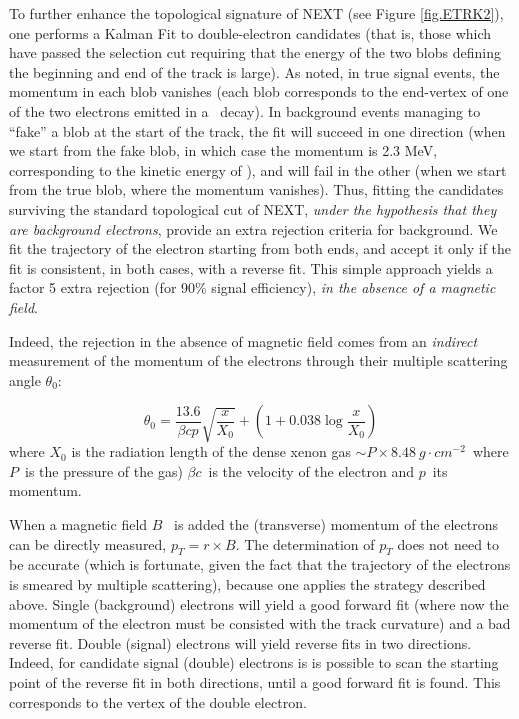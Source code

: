 To further enhance the topological signature of NEXT (see Figure \ref{fig.ETRK2}), one performs a Kalman Fit to double-electron candidates (that is, those which have passed the selection cut requiring that the energy of the two blobs defining the beginning and end of the track is large). As noted, in true signal events, the momentum in each blob vanishes (each blob corresponds to the end-vertex of one of the two electrons emitted in a \bb\ decay). In background events managing to ``fake'' a blob at the start of the track, the fit will succeed in one direction (when we start from the fake blob, in which case the momentum is 2.3 MeV, corresponding to the kinetic energy of \Qbb), and will fail in the other (when we start from the true blob, where the momentum vanishes). Thus, fitting the candidates surviving the standard topological cut of NEXT, {\em under the hypothesis that they are background electrons}, provide an extra rejection criteria for background. We fit the trajectory of the electron starting from both ends, and accept it only if the fit is consistent, in both cases, with a reverse fit.  This simple approach yields a factor 5 extra rejection (for 90\% signal efficiency), {\em in the absence of a magnetic field}.

Indeed, the rejection in the absence of magnetic field comes from an {\em indirect} measurement of the momentum of the electrons through their multiple scattering
angle $\theta_0$:

\begin{equation}
\theta_{0} = \frac{13.6}{\beta c p}\sqrt{\frac{x}{X_0}}+(1 + 0.038 \log{\frac{x}{X_0}})
\end{equation}
% 
 where $X_0$ is the radiation length of the dense xenon gas 
 $\sim P \times 8.48 ~g\cdot cm^{-2}$~where $P$~is the pressure of the gas) 
 $\beta c$~is the velocity of the electron and $p$~its momentum. 
 
 When a magnetic field $B$~ is added the (transverse) momentum of the electrons can be 
 directly measured,  $p_T = r \times B$. The determination of $p_T$ does not need to be accurate (which is fortunate, given the fact that the trajectory of the electrons is smeared by multiple scattering), because one applies the strategy described above. Single (background) electrons will yield a good forward fit (where now the momentum of the electron must be consisted with the track curvature) and a bad reverse fit. Double (signal) electrons will yield reverse fits in two directions. Indeed, for candidate signal (double) electrons is is possible to scan the starting point of the reverse fit in both directions, until a good forward fit is found. This corresponds to the vertex of the double electron. 
 
